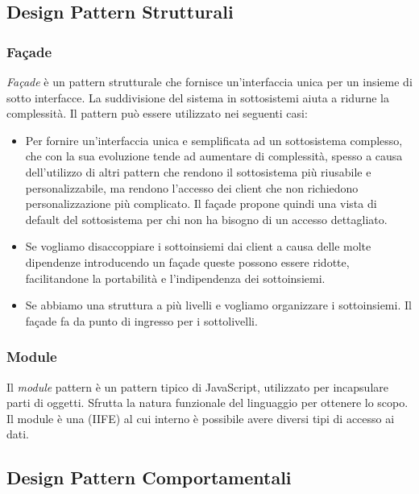 \subsection{Design Pattern Strutturali}

\subsubsection{Fa\c{c}ade}
\textit{Fa\c{c}ade} è un pattern strutturale che fornisce un'interfaccia unica per un insieme di sotto interfacce. La suddivisione del sistema in sottosistemi aiuta a ridurne la complessità.
Il pattern può essere utilizzato nei seguenti casi:
\begin{itemize}
	\item Per fornire un'interfaccia unica e semplificata ad un sottosistema complesso, che con la sua evoluzione tende ad aumentare di complessità, spesso a causa dell'utilizzo di altri pattern che rendono il sottosistema più riusabile e personalizzabile, ma rendono l'accesso dei client che non richiedono personalizzazione più complicato. Il fa\c{c}ade propone quindi una vista di default del sottosistema per chi non ha bisogno di un accesso dettagliato.
	\item Se vogliamo disaccoppiare i sottoinsiemi dai client a causa delle molte dipendenze introducendo un fa\c{c}ade queste possono essere ridotte, facilitandone la portabilità e l'indipendenza dei sottoinsiemi.
	\item Se abbiamo una struttura a più livelli e vogliamo organizzare i sottoinsiemi. Il fa\c{c}ade fa da punto di ingresso per i sottolivelli.
\end{itemize}

\subsubsection{Module}
Il \textit{module} pattern è un pattern tipico di JavaScript, utilizzato per incapsulare parti di oggetti.
Sfrutta la natura funzionale del linguaggio per ottenere lo scopo. Il module è una  (IIFE) al cui interno è possibile avere diversi tipi di accesso ai dati.

\subsection{Design Pattern Comportamentali}


